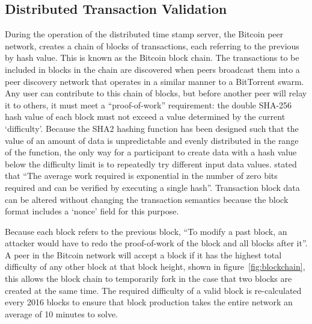 \subsection{Distributed Transaction Validation}
During the operation of the distributed time stamp server, the Bitcoin peer network, creates a chain of blocks of transactions, each referring to the previous by hash value. This is known as the Bitcoin block chain.  The transactions to be included in blocks in the chain are discovered when peers broadcast them into a peer discovery network that operates in a similar manner to a BitTorrent swarm\cite{swarm}.  Any user can contribute to this chain of blocks, but before another peer will relay it to others, it must meet a ``proof-of-work'' requirement: the double SHA-256 hash value of each block must not exceed a value determined by the current `difficulty'.  Because the SHA2 hashing function has been designed such that the value of an amount of data is unpredictable and evenly distributed in the range of the function, the only way for a participant to create data with a hash value below the difficulty limit is to repeatedly try different input data values\cite{btc-crypto}.  \textcite{satoshi} stated that ``The average work required is exponential in the number of zero bits required and can be verified by executing a single hash''. Transaction block data can be altered without changing the transaction semantics because the block format includes a `nonce' field for this purpose.

Because each block refers to the previous block, ``To modify a past block, an attacker would have to redo the proof-of-work of the block and all blocks after it''.  A peer in the Bitcoin network will accept a block if it has the highest total difficulty of any other block at that block height, shown in figure~\ref{fig:blockchain}, this allows the block chain to temporarily fork in the case that two blocks are created at the same time. The required difficulty of a valid block is re-calculated every 2016 blocks to ensure that block production takes the entire network an average of 10 minutes to solve.

